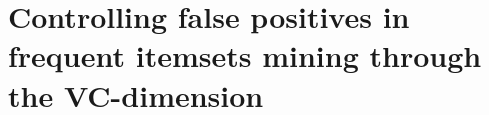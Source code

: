 \chapter{Controlling false positives in frequent itemsets mining through the
VC-dimension}\label{ch:realfis}
%






%

